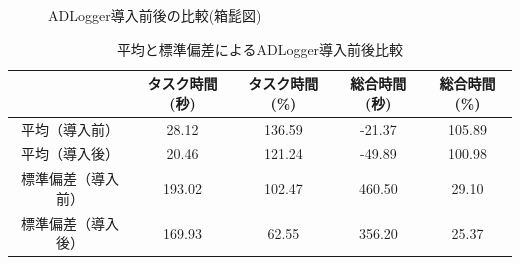 \begin{figure}[ht]
	\begin{center}
		\caption{ADLogger導入前後の比較(箱髭図)}
		\label{fig:10}
	\end{center}
\end{figure}


\begin{table}[ht]
\begin{center}
 \caption{平均と標準偏差によるADLogger導入前後比較}
\begin{tabular}{|c|c|c|c|c|} \hline
 & タスク時間(秒) & タスク時間(\%) & 総合時間(秒) & 総合時間(\%) \\ \hline 
平均（導入前）& 28.12& 136.59 & -21.37& 105.89 \\ \hline
平均（導入後）& 20.46& 121.24 & -49.89& 100.98 \\ \hline
標準偏差（導入前）& 193.02& 102.47 & 460.50& 29.10 \\ \hline
標準偏差（導入後）& 169.93& 62.55 & 356.20& 25.37 \\ \hline
\end{tabular}
  \label{tb:ave}
\end{center}
\end{table}

